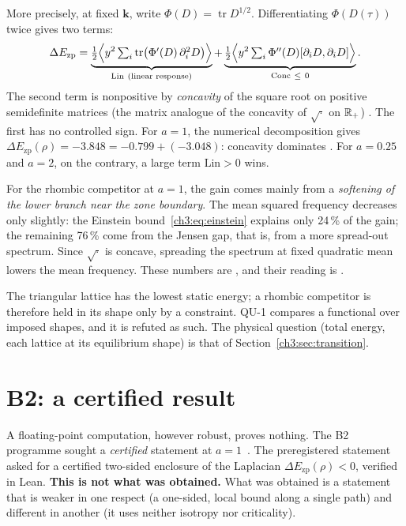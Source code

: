 More precisely, at fixed $\mathbf k$, write $\Phi(D)=\operatorname{tr}D^{1/2}$. Differentiating
$\Phi(D(\tau))$ twice gives two terms:
\[
\Delta E_{\mathrm{zp}}=\underbrace{\tfrac12\Bigl\langle y^2\textstyle\sum_i\operatorname{tr}\bigl(\Phi'(D)\,\partial_i^2D\bigr)\Bigr\rangle}_{\mathrm{Lin}\ \text{(linear response)}}
+\underbrace{\tfrac12\Bigl\langle y^2\textstyle\sum_i\Phi''(D)[\partial_iD,\partial_iD]\Bigr\rangle}_{\mathrm{Conc}\ \le\ 0} .
\]
The second term is nonpositive by \emph{concavity} of the square root on positive semidefinite matrices (the matrix
analogue of the concavity of $\sqrt{\cdot}$ on $\mathbb{R}_+$) \tierC. The first has no controlled sign. For $a=1$, the
numerical decomposition gives $\Delta E_{\mathrm{zp}}(\rho)=-3.848=-0.799+(-3.048)$: concavity dominates \tierX. For
$a=0.25$ and $a=2$, on the contrary, a large term $\mathrm{Lin}>0$ wins.

\begin{physbox}
For the rhombic competitor at $a=1$, the gain comes mainly from a \emph{softening of the lower branch near the zone
boundary}. The mean squared frequency decreases only slightly: the Einstein bound~\eqref{ch3:eq:einstein} explains only
24\,\% of the gain; the remaining 76\,\% come from the Jensen gap, that is, from a more spread-out spectrum. Since
$\sqrt{\cdot}$ is concave, spreading the spectrum at fixed quadratic mean lowers the mean frequency.
These numbers are \tierX, and their reading is \tierC.
\end{physbox}

\begin{warnbox}
The triangular lattice has the lowest static energy; a rhombic competitor is therefore held in its shape only by a
constraint. QU-1 compares a functional over imposed shapes, and it is refuted as such. The physical question
(total energy, each lattice at its equilibrium shape) is that of Section~\ref{ch3:sec:transition}.
\end{warnbox}

\section{B2: a certified result}\label{ch3:sec:b2}
A floating-point computation, however robust, proves nothing. The B2 programme sought a \emph{certified} statement at
$a=1$~\cite{ch3-b2}. The preregistered statement asked for a certified two-sided enclosure of the Laplacian
$\Delta E_{\mathrm{zp}}(\rho)<0$, verified in Lean. \textbf{This is not what was obtained.} What was obtained is a
statement that is weaker in one respect (a one-sided, local bound along a single path) and different in another (it uses
neither isotropy nor criticality).

